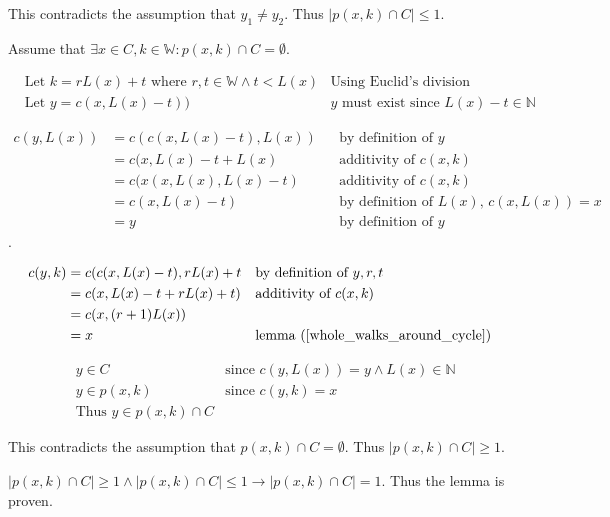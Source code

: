 \documentclass[11pt]{article}
\begin{document}
    This contradicts the assumption that $y_{1}\not = y_{2}$. Thus $|p(x,k)\cap C| \leq 1$.

    Assume that $\exists x \in C,k \in \mathbb{W}: p(x,k)\cap C = \emptyset$.

    \begin{align*}
        & \text{Let $k = rL(x)+t$ where $r,t\in \mathbb{W} \land t<L(x)$} & \text{Using Euclid's division lemma} \\
        & \text{Let $y = c(x,L(x)-t))$} & \text{$y$ must exist since $L(x)-t \in \mathbb{N}$}
    \end{align*}

    \begin{align*}
        \text{$c(y,L(x))$} &= \text{$c(c(x,L(x)-t),L(x))$} && \text{by definition of $y$} \\
        &= \text{$c(x,L(x)-t+L(x)$} && \text{additivity of $c(x,k)$} \\
        &= \text{$c(x(x,L(x),L(x)-t)$} && \text{additivity of $c(x,k)$} \\
        &= \text{$c(x,L(x)-t)$} && \text{by definition of $L(x)$, $c(x,L(x))=x$} \\
        &= \text{$y$} && \text{by definition of $y$}
    \end{align*}.

    \begin{align*}
        \text{$c(y,k)$} &= \text{$c(c(x,L(x)-t),rL(x)+t$} && \text{by definition of $y,r,t$} \\
        &= \text{$c(x,L(x)-t+rL(x)+t)$} && \text{additivity of $c(x,k)$} \\
        &= \text{$c(x,(r+1)L(x))$} && \text{} \\
        &= \text{$x$} && \text{lemma (\ref{whole_walks_around_cycle})}
    \end{align*}


    \begin{align*}
        & \text{$y \in C$} & \text{since $c(y,L(x))=y \land L(x)\in \mathbb{N}$} \\
        & \text{$y \in p(x,k)$} & \text{since $c(y,k)=x$} \\
        & \text{Thus $y \in p(x,k)\cap C$} & \text{}
    \end{align*}

    This contradicts the assumption that $p(x,k)\cap C = \emptyset$. Thus $|p(x,k)\cap C| \geq 1$.

    $|p(x,k)\cap C| \geq 1 \land |p(x,k)\cap C| \leq 1 \rightarrow |p(x,k)\cap C|=1$. Thus the lemma is proven.
\end{document}
